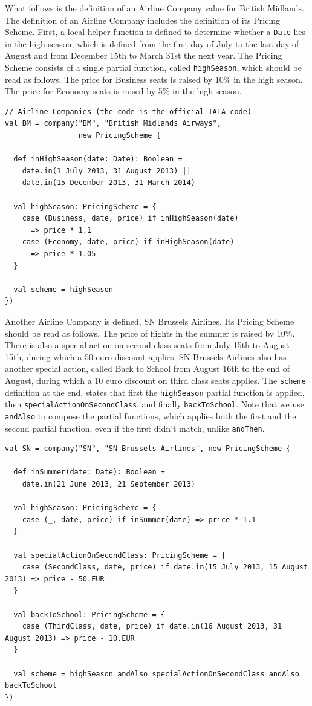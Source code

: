 \documentclass[a4paper]{article}
\newcommand{\cc}[1]{\texttt{#1}}
\renewcommand{\sc}[1]{\lstinline{#1}}
\begin{document}
What follows is the definition of an Airline Company value for British Midlands.
The definition of an Airline Company includes the definition of its Pricing Scheme.
First, a local helper function is defined to determine whether a \cc{Date} lies in the high season, which is defined from the first day of July to the last day of August and from December 15th to March 31st the next year.
The Pricing Scheme consists of a single partial function, called \cc{highSeason}, which should be read as follows.
The price for Business seats is raised by 10\% in the high season.
The price for Economy seats is raised by 5\% in the high season.

\begin{lstlisting}
// Airline Companies (the code is the official IATA code)
val BM = company("BM", "British Midlands Airways",
                 new PricingScheme {

  def inHighSeason(date: Date): Boolean =
    date.in(1 July 2013, 31 August 2013) ||
    date.in(15 December 2013, 31 March 2014)

  val highSeason: PricingScheme = {
    case (Business, date, price) if inHighSeason(date)
      => price * 1.1
    case (Economy, date, price) if inHighSeason(date)
      => price * 1.05
  }

  val scheme = highSeason
})
\end{lstlisting}

Another Airline Company is defined, SN Brussels Airlines.
Its Pricing Scheme should be read as follows.
The price of flights in the summer is raised by 10\%.
There is also a special action on second class seats from July 15th to August 15th, during which a 50 euro discount applies.
SN Brussels Airlines also has another special action, called Back to School from August 16th to the end of August, during which a 10 euro discount on third class seats applies.
The \sc{scheme} definition at the end, states that first the \cc{highSeason} partial function is applied, then \cc{special\-Action\-On\-Second\-Class}, and finally \cc{backToSchool}.
Note that we use \sc{andAlso} to compose the partial functions, which applies both the first and the second partial function, even if the first didn't match, unlike \sc{andThen}.

\begin{lstlisting}
val SN = company("SN", "SN Brussels Airlines", new PricingScheme {

  def inSummer(date: Date): Boolean =
    date.in(21 June 2013, 21 September 2013)

  val highSeason: PricingScheme = {
    case (_, date, price) if inSummer(date) => price * 1.1
  }

  val specialActionOnSecondClass: PricingScheme = {
    case (SecondClass, date, price) if date.in(15 July 2013, 15 August 2013) => price - 50.EUR
  }

  val backToSchool: PricingScheme = {
    case (ThirdClass, date, price) if date.in(16 August 2013, 31 August 2013) => price - 10.EUR
  }

  val scheme = highSeason andAlso specialActionOnSecondClass andAlso backToSchool
})
\end{lstlisting}
\end{document}
